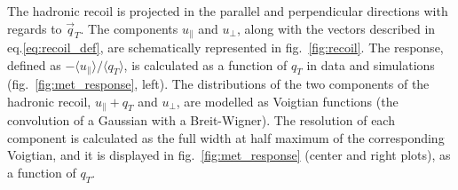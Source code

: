 \noindent The hadronic recoil is projected in the parallel and perpendicular directions with regards to $\vec{q}_T$. The components $u_{\parallel}$ and $u_{\bot}$, along with the vectors described in eq.\ref{eq:recoil_def}, are schematically represented in fig.~\ref{fig:recoil}. The \MET response, defined as $- \langle u_{\parallel} \rangle / \langle q_T \rangle$, is calculated as a function of $q_T$ in data and simulations (fig.~\ref{fig:met_response}, left). The distributions of the two components of the hadronic recoil, $u_{\parallel} + q_T$ and $u_{\bot}$, are modelled as Voigtian functions (the convolution of a Gaussian with a Breit-Wigner). %
 The resolution of each component is calculated as the full width at half maximum of the corresponding Voigtian, and it is displayed in fig.~\ref{fig:met_response} (center and right plots), as a function of $q_T$.

